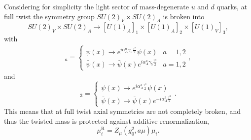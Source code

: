 Considering for simplicity the light sector of mass-degenerate $u$ and $d$ quarks, at full twist the symmetry group $SU(2)_V\times SU(2)_A$ is broken into
\begin{equation}
SU(2)_V\times SU(2)_A\rightarrow[U(1)_A]_1\times[U(1)_A]_2\times[U(1)_V]_3,
\end{equation}
with 
\begin{align}
[U(1)_A]_a=\left\{\begin{matrix}
\psi(x)\rightarrow e^{i\alpha_A^a\gamma_5\frac{\tau^a}{2}}\psi(x) & a=1,2 \\ 
\bar{\psi}(x)\rightarrow \bar{\psi}(x)e^{i\alpha_A^a\gamma_5\frac{\tau^a}{2}} & a=1,2
\end{matrix}\right.,
\end{align}
and
\begin{equation}
[U(1)_V]_3=\left\{\begin{matrix}
\psi(x)\rightarrow e^{i\alpha_A^3\frac{\tau^3}{2}}\psi(x) \\ 
\bar{\psi}(x)\rightarrow \bar{\psi}(x)e^{-i\alpha_A^3\frac{\tau^3}{2}}
\end{matrix}\right..
\end{equation}
This means that at full twist axial symmetries are not completely broken, and thus the twisted mass is protected against additive renormalization,
\begin{equation}
\label{ch_foundation:eq:muR}
\mu_i^{\textrm{R}}=Z_{\mu}(g_0^2,a\mu)\mu_i.
\end{equation}

